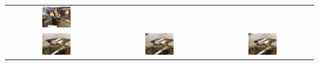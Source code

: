 \begin{tabular}{ccc}
            \includegraphics[width=0.3\textwidth]{../o-3dgs/eval/horns/test/ours_30000/renders/00000.png} \\
            \includegraphics[width=0.3\textwidth]{../o-3dgs/eval/trex/test/ours_30000/gt/00000.png} &
            \includegraphics[width=0.3\textwidth]{../o-3dgs/eval/trex/test/ours_30000/renders/00000.png} & 
            \includegraphics[width=0.3\textwidth]{../o-3dgs/eval/trex/test/ours_30000/renders/00000.png} \\
    \end{tabular}
    